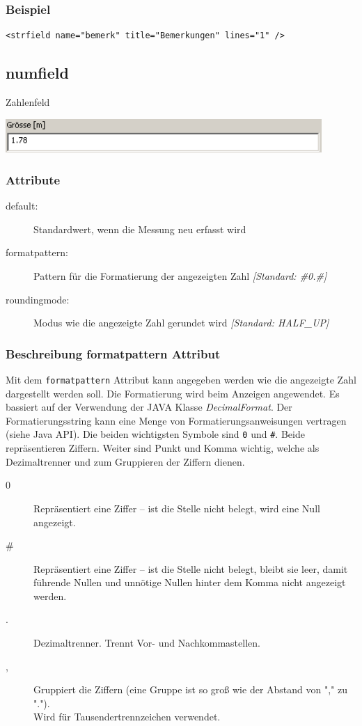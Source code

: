 \documentclass[a4paper]{scrartcl}
\begin{document}
\subsubsection{Beispiel}
\begin{lstlisting}
<strfield name="bemerk" title="Bemerkungen" lines="1" />
\end{lstlisting}


\subsection{numfield}
Zahlenfeld
\begin{center}
    \includegraphics[width=12cm]{images/numfield.png}
\end{center}
\subsubsection{Attribute}
\begin{description}
    \item [default:] Standardwert, wenn die Messung neu erfasst wird
    \item [formatpattern:] Pattern für die Formatierung der angezeigten Zahl
    \textit{[Standard: \#0.\#]}
    \item [roundingmode:] Modus wie die angezeigte Zahl gerundet wird
    \textit{[Standard: HALF\_UP]}
\end{description}

\subsubsection{Beschreibung formatpattern Attribut}
Mit dem \texttt{formatpattern} Attribut kann angegeben werden wie die angezeigte Zahl
dargestellt werden soll. Die Formatierung wird beim Anzeigen angewendet. Es bassiert auf der Verwendung der JAVA Klasse
\textit{DecimalFormat}. Der Formatierungsstring kann eine Menge von
Formatierungsanweisungen vertragen (siehe Java API). Die beiden
wichtigsten Symbole sind \texttt{0} und \texttt{\#}. Beide repräsentieren
Ziffern. Weiter sind Punkt und Komma wichtig, welche als Dezimaltrenner und
zum Gruppieren der Ziffern dienen.
\begin{description}
  \item [0] Repräsentiert eine Ziffer – ist die Stelle nicht belegt, wird eine  Null angezeigt.
  \item [\#] Repräsentiert eine Ziffer – ist die Stelle nicht belegt, bleibt sie  leer, damit führende Nullen und unnötige Nullen hinter dem Komma nicht angezeigt werden.
  \item [.] Dezimaltrenner. Trennt Vor- und Nachkommastellen.
  \item [,] Gruppiert die Ziffern (eine Gruppe ist so groß wie der Abstand von
  "," zu "."). \\
  Wird für Tausendertrennzeichen verwendet.
\end{description}
\end{document}
